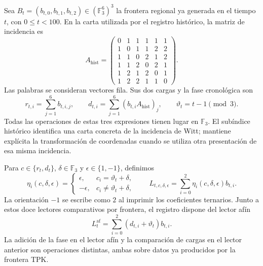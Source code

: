 Sea $B_t=(b_{t,0},b_{t,1},b_{t,2})\in(\mathbb F_3^6)^3$ la frontera
regional ya generada en el tiempo $t$, con $0\leq t<100$. En la carta
utilizada por el registro histórico, la matriz de incidencia es
\[
 A_{\mathrm{hist}}=
 \begin{pmatrix}
 0&1&1&1&1&1\\
 1&0&1&1&2&2\\
 1&1&0&2&1&2\\
 1&1&2&0&2&1\\
 1&2&1&2&0&1\\
 1&2&2&1&1&0
 \end{pmatrix}.
\]
Las palabras se consideran vectores fila. Sus dos cargas y la fase
cronológica son
\[
 r_{t,i}=\sum_{j=1}^{6}b_{t,i,j},\qquad
 d_{t,i}=\sum_{j=1}^{6}(b_{t,i}A_{\mathrm{hist}})_j,
 \qquad \vartheta_t=t-1\pmod 3.
\]
Todas las operaciones de estas tres expresiones tienen lugar en
$\mathbb F_3$. El subíndice histórico identifica una carta concreta de
la incidencia de Witt; mantiene explícita la transformación de coordenadas
cuando se utiliza otra presentación de esa misma incidencia.

Para $c\in\{r_t,d_t\}$, $\delta\in\mathbb F_3$ y
$\epsilon\in\{1,-1\}$, definimos
\[
 \eta_i(c,\delta,\epsilon)=
 \begin{cases}
  \epsilon,&c_i=\vartheta_t+\delta,\\
  -\epsilon,&c_i\ne\vartheta_t+\delta,
 \end{cases}
 \qquad
 L_{t,c,\delta,\epsilon}
   =\sum_{i=0}^{2}\eta_i(c,\delta,\epsilon)b_{t,i}.
\]
La orientación $-1$ se escribe como $2$ al imprimir los coeficientes
ternarios. Junto a estos doce lectores comparativos por frontera, el
registro dispone del lector afín
\[
 L^{\mathrm{af}}_t
    =\sum_{i=0}^{2}(d_{t,i}+\vartheta_t)b_{t,i}.
\]
La adición de la fase en el lector afín y la comparación de cargas en
el lector anterior son operaciones distintas, ambas sobre datos ya
producidos por la frontera TPK.

